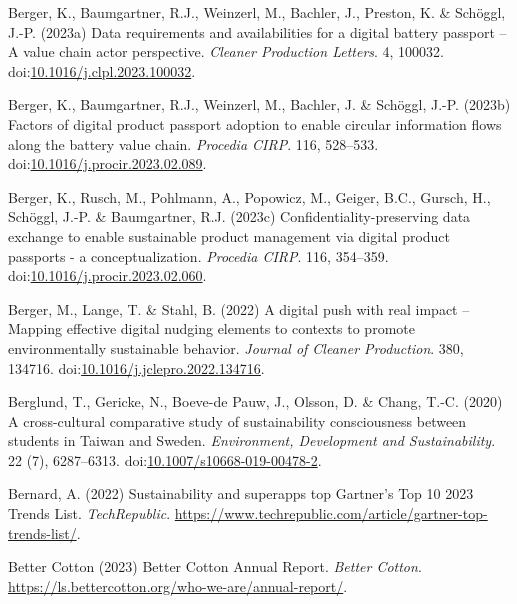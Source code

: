 \documentclass[
  letterpaper,
  DIV=11,
  numbers=noendperiod]{scrartcl}
\newlength{\cslhangindent}
\newenvironment{CSLReferences}[2] %
 {\begin{list}{}{%
  \setlength{\itemindent}{0pt}
  \setlength{\leftmargin}{0pt}
  \setlength{\parsep}{0pt}
  \ifodd #1
   \setlength{\leftmargin}{\cslhangindent}
   \setlength{\itemindent}{-1\cslhangindent}
  \fi
  \setlength{\itemsep}{#2\baselineskip}}}
 {\end{list}}
\begin{document}
\begin{CSLReferences}{0}{1}
Berger, K., Baumgartner, R.J., Weinzerl, M., Bachler, J., Preston, K. \&
Schöggl, J.-P. (2023a) Data requirements and availabilities for a
digital battery passport -- {A} value chain actor perspective.
\emph{Cleaner Production Letters}. 4, 100032.
doi:\href{https://doi.org/10.1016/j.clpl.2023.100032}{10.1016/j.clpl.2023.100032}.

Berger, K., Baumgartner, R.J., Weinzerl, M., Bachler, J. \& Schöggl,
J.-P. (2023b) Factors of digital product passport adoption to enable
circular information flows along the battery value chain. \emph{Procedia
CIRP}. 116, 528--533.
doi:\href{https://doi.org/10.1016/j.procir.2023.02.089}{10.1016/j.procir.2023.02.089}.

Berger, K., Rusch, M., Pohlmann, A., Popowicz, M., Geiger, B.C., Gursch,
H., Schöggl, J.-P. \& Baumgartner, R.J. (2023c)
Confidentiality-preserving data exchange to enable sustainable product
management via digital product passports - a conceptualization.
\emph{Procedia CIRP}. 116, 354--359.
doi:\href{https://doi.org/10.1016/j.procir.2023.02.060}{10.1016/j.procir.2023.02.060}.

Berger, M., Lange, T. \& Stahl, B. (2022) A digital push with real
impact -- {Mapping} effective digital nudging elements to contexts to
promote environmentally sustainable behavior. \emph{Journal of Cleaner
Production}. 380, 134716.
doi:\href{https://doi.org/10.1016/j.jclepro.2022.134716}{10.1016/j.jclepro.2022.134716}.

Berglund, T., Gericke, N., Boeve-de Pauw, J., Olsson, D. \& Chang, T.-C.
(2020) A cross-cultural comparative study of sustainability
consciousness between students in {Taiwan} and {Sweden}.
\emph{Environment, Development and Sustainability}. 22 (7), 6287--6313.
doi:\href{https://doi.org/10.1007/s10668-019-00478-2}{10.1007/s10668-019-00478-2}.

Bernard, A. (2022) Sustainability and superapps top {Gartner}'s {Top} 10
2023 {Trends List}. \emph{TechRepublic}.
\url{https://www.techrepublic.com/article/gartner-top-trends-list/}.

Better Cotton (2023) Better {Cotton Annual Report}. \emph{Better
Cotton}. \url{https://ls.bettercotton.org/who-we-are/annual-report/}.


\end{CSLReferences}
\end{document}
